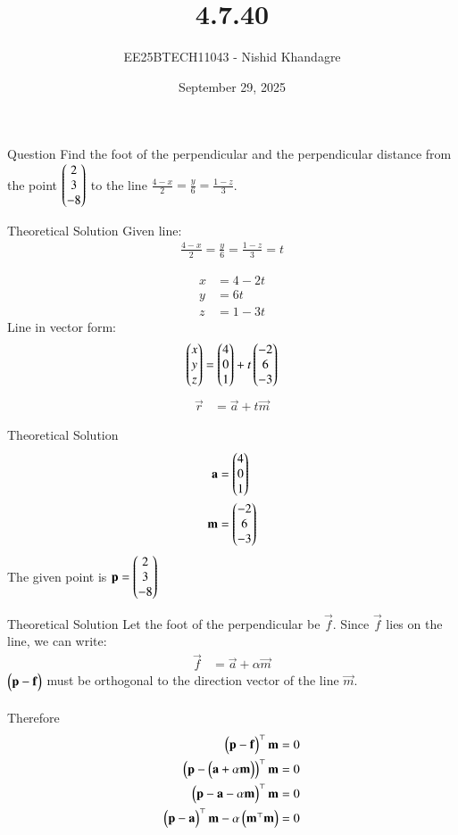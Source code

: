 \documentclass{beamer}
\title{4.7.40}
\date{September 29, 2025}
\author{EE25BTECH11043 - Nishid Khandagre}
\begin{document}
\frame{\titlepage}

\begin{frame}{Question}
Find the foot of the perpendicular and the perpendicular distance from the point $\begin{pmatrix}2\\3\\-8\end{pmatrix}$ to the line $\frac{4-x}{2} = \frac{y}{6} = \frac{1-z}{3}$.
\end{frame}

\begin{frame}{Theoretical Solution}
Given line:
\begin{align}
\frac{4-x}{2}=\frac{y}{6}=\frac{1-z}{3}=t
\end{align}

\begin{align}
x &= 4-2t \\
y &= 6t \\
z &= 1-3t
\end{align}
Line in vector form:
\begin{align}
\begin{pmatrix}x \\ y \\ z\end{pmatrix} = \begin{pmatrix}4 \\ 0 \\ 1\end{pmatrix} + t \begin{pmatrix}-2 \\ 6 \\ -3\end{pmatrix}
\end{align}
\begin{align}
\vec{r} &= \vec{a} + t \vec{m}
\end{align}
\end{frame}

\begin{frame}{Theoretical Solution}
\begin{align}
\mathbf{a} &= \begin{pmatrix}4 \\ 0 \\ 1\end{pmatrix} \\
\mathbf{m} &= \begin{pmatrix}-2 \\ 6 \\ -3\end{pmatrix}
\end{align}
The given point is $\mathbf{p} = \begin{pmatrix}2 \\ 3 \\ -8\end{pmatrix}$
\end{frame}

\begin{frame}{Theoretical Solution}
Let the foot of the perpendicular be $\vec{f}$. Since $\vec{f}$ lies on the line, we can write:
\begin{align}
\vec{f} &= \vec{a} + \alpha\vec{m}
\end{align}
$\begin{pmatrix}\mathbf{p} - \mathbf{f}\end{pmatrix}$ must be orthogonal to the direction vector of the line $\vec{m}$.\\ \\
Therefore
\begin{align}
\begin{pmatrix}\mathbf{p} - \mathbf{f}\end{pmatrix}^\top \mathbf{m} = 0\\
\begin{pmatrix}\mathbf{p} - \begin{pmatrix}\mathbf{a} + \alpha\mathbf{m}\end{pmatrix}\end{pmatrix}^\top \mathbf{m} = 0\\
\begin{pmatrix}\mathbf{p} - \mathbf{a} - \alpha\mathbf{m}\end{pmatrix}^\top \mathbf{m} = 0\\
\begin{pmatrix}\mathbf{p} - \mathbf{a}\end{pmatrix}^\top \mathbf{m} - \alpha \begin{pmatrix}\mathbf{m}^\top \mathbf{m}\end{pmatrix} = 0
\end{align}
\end{frame}
\end{document}
